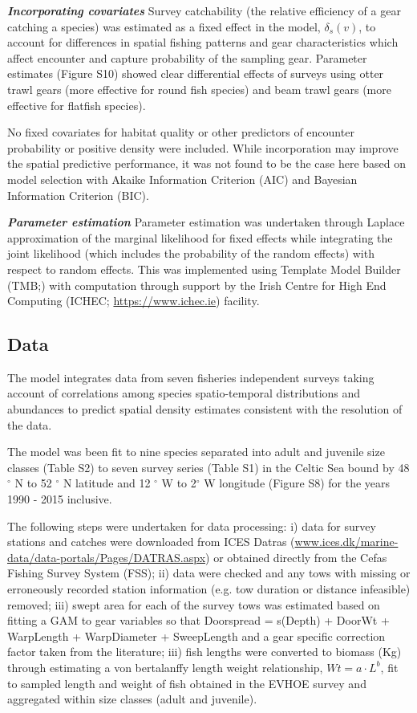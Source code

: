 \documentclass{nature}
\begin{document}
\begin{linenumbers}
\textbf{\textit{Incorporating covariates}} Survey catchability (the relative
efficiency of a gear catching a species) was estimated as a fixed effect in the
model, $\delta_{s}(v)$, to account for differences in spatial fishing patterns
and gear characteristics which affect encounter and capture probability of the
sampling gear\cite{Thorson2014}. Parameter estimates (Figure S10) showed clear
differential effects of surveys using otter trawl gears (more effective for
round fish species) and beam trawl gears (more effective for flatfish species).

No fixed covariates for habitat quality or other predictors of encounter
probability or positive density were included. While incorporation may improve
the spatial predictive performance\cite{Thorson2017}, it was not found to be
the case here based on model selection with Akaike Information Criterion (AIC)
and Bayesian Information Criterion (BIC).

\textbf{\textit{Parameter estimation}} Parameter estimation was undertaken
through Laplace approximation of the marginal likelihood for fixed effects
while integrating the joint likelihood (which includes the probability of the
random effects) with respect to random effects. This was implemented using
Template Model Builder (TMB;\cite{Kristensen2015}) with computation through
support by the Irish Centre for High End Computing (ICHEC;
\url{https://www.ichec.ie}) facility.  

\subsection{Data}

The model integrates data from seven fisheries independent surveys taking
account of correlations among species spatio-temporal distributions and
abundances to predict spatial density estimates consistent with the resolution
of the data. 

The model was been fit to nine species separated into adult and juvenile size
classes (Table S2) to seven survey series (Table S1) in the Celtic Sea bound by
48$^{\circ}$ N to 52 $^{\circ}$ N latitude and 12 $^{\circ}$ W to 2$^{\circ}$ W
longitude (Figure S8) for the years 1990 - 2015 inclusive. 

The following steps were undertaken for data processing: i) data for survey
stations and catches were downloaded from ICES Datras
(\url{www.ices.dk/marine-data/data-portals/Pages/DATRAS.aspx}) or obtained
directly from the Cefas Fishing Survey System (FSS); ii) data were checked and
any tows with missing or erroneously recorded station information (e.g. tow
duration or distance infeasible) removed; iii) swept area for each of the
survey tows was estimated based on fitting a GAM to gear variables so that
Doorspread = s(Depth) + DoorWt + WarpLength + WarpDiameter + SweepLength and a
gear specific correction factor taken from the literature\cite{Piet2009}; iii)
fish lengths were converted to biomass (Kg) through estimating a von
bertalanffy length weight relationship, $Wt = a \cdot L^{b}$, fit to sampled
length and weight of fish obtained in the EVHOE survey and aggregated within
size classes (adult and juvenile). 


\end{linenumbers}
\end{document}
